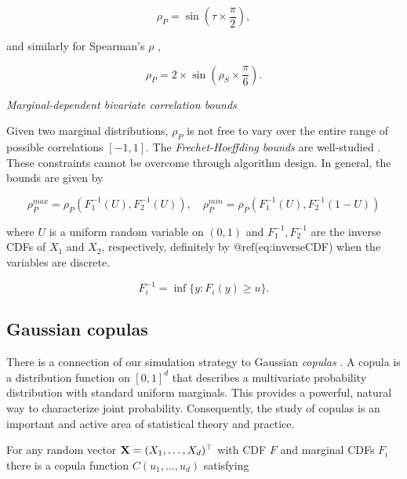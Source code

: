 \documentclass[
]{jss}
\begin{document}
\begin{equation}
\label{eq:convertKendall}
\rho_{P} = \sin \left( \tau \times \frac{\pi}{2} \right), 
\end{equation}

\noindent and similarly for Spearman's \(\rho\) \citep{K58},

\begin{equation}
\label{eq:convertSpearman}
\rho_P = 2 \times \sin \left( \rho_S \times \frac{\pi}{6} \right).
\end{equation}

\emph{Marginal-dependent bivariate correlation bounds}

Given two marginal distributions, \(\rho_P\) is not free to vary over
the entire range of possible correlations \([-1,1]\). The
\emph{Frechet-Hoeffding bounds} are well-studied
\citep{Nelsen2007, BF17}. These constraints cannot be overcome through
algorithm design. In general, the bounds are given by

\begin{equation}
\label{eq:frechet}
\rho_P^{max} = \rho_P \left( F^{-1}_1 (U), F^{-1}_2 (U) \right), \quad \rho_P^{min} = \rho_P \left( F^{-1}_1 (U), F^{-1}_2 (1 - U) \right)
\end{equation}

\noindent where \(U\) is a uniform random variable on \((0,1)\) and
\(F^{-1}_1, F^{-1}_2\) are the inverse CDFs of \(X_1\) and \(X_2\),
respectively, definitely by @ref(eq:inverseCDF) when the variables are
discrete.

\begin{equation}
F_{i}^{-1} = \inf\{y:F_{i}(y) \geq u \}.
\label{eq:inverseCDF}
\end{equation}

\hypertarget{gaussian-copulas}{%
\subsection{Gaussian copulas}\label{gaussian-copulas}}

There is a connection of our simulation strategy to Gaussian
\emph{copulas} \citep{Nelsen2007}. A copula is a distribution function
on \([0,1]^d\) that describes a multivariate probability distribution
with standard uniform marginals. This provides a powerful, natural way
to characterize joint probability. Consequently, the study of copulas is
an important and active area of statistical theory and practice.

For any random vector \({\bf X}=(X_1, \ldots, X_d)^\top\) with CDF \(F\)
and marginal CDFs \(F_i\) there is a copula function
\(C(u_1, \ldots, u_d)\) satisfying
\end{document}
